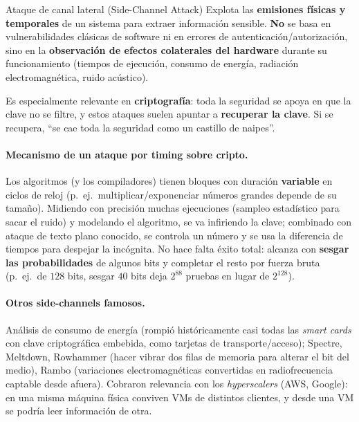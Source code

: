 \documentclass[../main.tex]{subfiles}
\begin{document}
\begin{definicion}{Ataque de canal lateral (Side-Channel Attack)}
Explota las \textbf{emisiones físicas y temporales} de un sistema para extraer
información sensible. \textbf{No} se basa en vulnerabilidades clásicas de software
ni en errores de autenticación/autorización, sino en la \textbf{observación de
efectos colaterales del hardware} durante su funcionamiento (tiempos de ejecución,
consumo de energía, radiación electromagnética, ruido acústico).
\end{definicion}

Es especialmente relevante en \textbf{criptografía}: toda la seguridad se apoya en
que la clave no se filtre, y estos ataques suelen apuntar a \textbf{recuperar la
clave}. Si se recupera, ``se cae toda la seguridad como un castillo de naipes''.

\paragraph{Mecanismo de un ataque por timing sobre cripto.} Los algoritmos (y los
compiladores) tienen bloques con duración \textbf{variable} en ciclos de reloj
(p.\ ej.\ multiplicar/exponenciar números grandes depende de su tamaño). Midiendo
con precisión muchas ejecuciones (sampleo estadístico para sacar el ruido) y
modelando el algoritmo, se va infiriendo la clave; combinado con ataque de texto
plano conocido, se controla un número y se usa la diferencia de tiempos para
despejar la incógnita. No hace falta éxito total: alcanza con \textbf{sesgar las
probabilidades} de algunos bits y completar el resto por fuerza bruta (p.\ ej.\ de
$128$ bits, sesgar $40$ bits deja $2^{88}$ pruebas en lugar de $2^{128}$).

\paragraph{Otros side-channels famosos.} Análisis de consumo de energía (rompió
históricamente casi todas las \textit{smart cards} con clave criptográfica
embebida, como tarjetas de transporte/acceso); Spectre, Meltdown, Rowhammer (hacer
vibrar dos filas de memoria para alterar el bit del medio), Rambo (variaciones
electromagnéticas convertidas en radiofrecuencia captable desde afuera). Cobraron
relevancia con los \textit{hyperscalers} (AWS, Google): en una misma máquina física
conviven VMs de distintos clientes, y desde una VM se podría leer información de otra.
\end{document}
